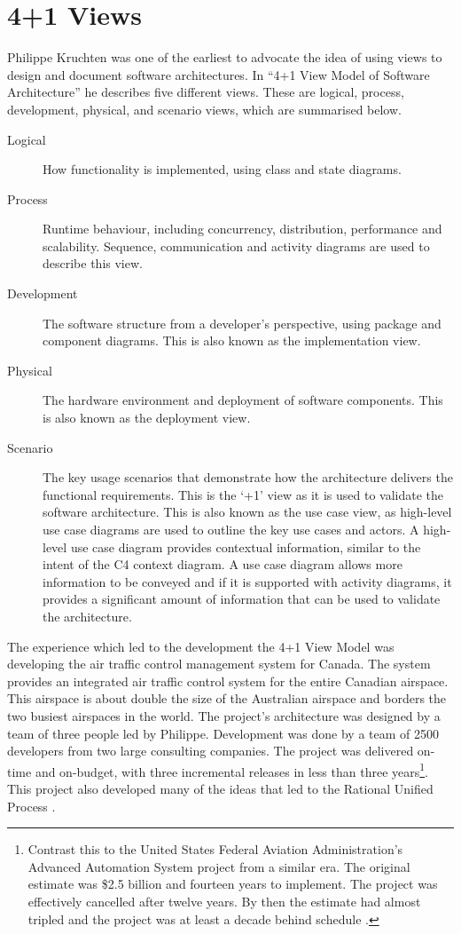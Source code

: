 \section{4+1 Views}
Philippe Kruchten was one of the earliest to advocate the idea of using views to design and document software architectures.
In ``4+1 View Model of Software Architecture'' \cite{4+1-model} he describes five different views.
These are logical, process, development, physical, and scenario views, which are summarised below.
\begin{description}
    \item[Logical] How functionality is implemented, using class and state diagrams.
    \item[Process] Runtime behaviour, including concurrency, distribution, performance and scalability.
                            Sequence, communication and activity diagrams are used to describe this view.
    \item[Development] The software structure from a developer's perspective, using package and component diagrams.
                                    This is also known as the implementation view.
    \item[Physical] The hardware environment and deployment of software components.
                            This is also known as the deployment view.
    \item[Scenario] The key usage scenarios that demonstrate how the architecture delivers the functional requirements.
                             This is the `+1' view as it is used to validate the software architecture.
                             This is also known as the use case view, as high-level use case diagrams are used to outline the key use cases and actors.
							 A high-level use case diagram provides contextual information, similar to the intent of the C4 context diagram.
							 A use case diagram allows more information to be conveyed and if it is supported with activity diagrams,
							 it provides a significant amount of information that can be used to validate the architecture.
\end{description}
The experience which led to the development the 4+1 View Model was developing the air traffic control management system for Canada.
The system provides an integrated air traffic control system for the entire Canadian airspace.
This airspace is about double the size of the Australian airspace and borders the two busiest airspaces in the world.
The project's architecture was designed by a team of three people led by Philippe.
Development was done by a team of 2500 developers from two large consulting companies.
The project was delivered on-time and on-budget, with three incremental releases in less than three years\footnote{Contrast
this to the United States Federal Aviation Administration's Advanced Automation System project from a similar era.
The original estimate was \$2.5 billion and fourteen years to implement.
The project was effectively cancelled after twelve years.
By then the estimate had almost tripled and the project was at least a decade behind schedule \cite{faa-aas}.}.
This project also developed many of the ideas that led to the Rational Unified Process \cite{kruchten2004rational}.



